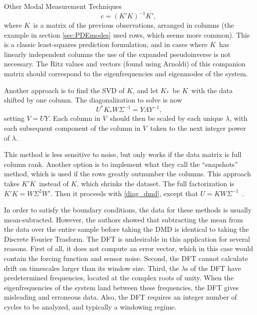 \documentclass[a4paper,10pt]{report}
\numberwithin{equation}{section}
\begin{document}
{\begin{chapter}
\begin{section}{Other Modal Measurement Techniques}
\begin{equation}
c = (K'  K)^{-1} K' , 
\end{equation}
where $K$\  is a matrix of the previous observations, arranged in columns (the example in section \ref{sec:PDEmodes} used rows, which seems more common). This is a classic least-squares prediction formulation, and in cases where $K$\  has linearly independent columns the use of the expanded pseudoinverse is not necessary. The Ritz values and vectors (found using Arnoldi) of this companion matrix should correspond to the eigenfrequencies and eigenmodes of the system. \cite{Chen2012}
\par
Another approach is to find the SVD of $K$, and let $K_{*}$\  be $K$\  with the data shifted by one column. The diagonalization to solve is now
\begin{equation}
U^*K_{*}W\Sigma^{-1} = Y\Lambda Y^{-1}\text{,}
\end{equation}
setting $V = UY$. Each column in $V$\  should then be scaled by each unique $\lambda$, with each subsequent component of the column in $V$\  taken to the next integer power of $\lambda$. \cite{Chen2012}
\par
This method is less sensitive to noise, but only works if the data matrix is full column rank. Another option is to implement what they call the ``snapshots'' method, which is used if the rows greatly outnumber the columns. This approach takes $K'K$\  instead of $K$, which shrinks the dataset. The full factorization is $K'K = W\Sigma^2W'$. Then it proceeds with \eqref{diag_dmd}, except that $U = KW\Sigma^{-1}$\  .\cite{Chen2012}
\par
In order to satisfy the boundary conditions, the data for these methods is usually mean-subracted. However, the authors showed that subtracting the mean from the data over the entire sample before taking the DMD is identical to taking the Discrete Fourier Trasform. The DFT is undesirable in this application for several reasons. First of all, it does not compute an error vector, which in this case would contain the forcing function and sensor noise. Second, the DFT cannot calculate drift on timescales larger than its window size. Third, the $\lambda$s of the DFT have predetermined frequencies, located at the complex roots of unity. When the eigenfrequencies of the system land between these frequencies, the DFT gives misleading and erroneous data. Also, the DFT requires an integer number of cycles to be analyzed, and typically a windowing regime. \cite{Chen2012}
\par

\end{section}
\end{chapter}}
\end{document}
